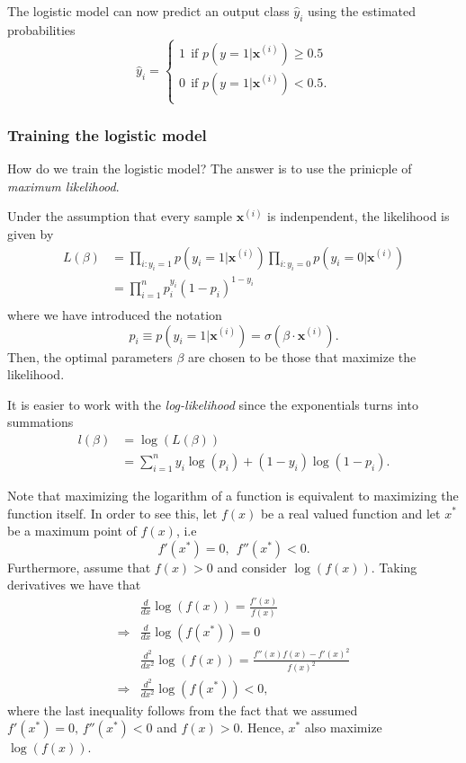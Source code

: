 \documentclass[a4paper, twocolumn]{article}
\begin{document}
The logistic model can now predict an output class $\hat{y}_i$ using the estimated probabilities  
\begin{equation}
 \hat{y}_i = \begin{cases}
            1 \ \ \text{if }  p \left(y=1 | \mathbf{x}^{(i)} \right) \geq 0.5 \\
            0 \ \ \text{if }  p \left(y=1 | \mathbf{x}^{(i)} \right) < 0.5. \\
           \end{cases}
\end{equation}
\subsubsection{Training the logistic model}
How do we train the logistic model? The answer is to use the prinicple of \textit{maximum likelihood}\autocite{Hastie}. 

Under the assumption that every sample $\mathbf{x}^{(i)}$ is indenpendent, the likelihood is given by 
\begin{align}
 L(\beta) &= \prod_{i : y_i = 1} p(y_i=1 | \mathbf{x}^{(i)}) \prod_{i : y_i = 0} p(y_i=0 | \mathbf{x}^{(i)}) \nonumber \\
 &= \prod_{i=1}^n p_i^{y_i} ( 1-p_i)^{1-y_i} \\
\end{align}
where we have introduced the notation
\begin{equation}
 p_i \equiv p(y_i=1 | \mathbf{x}^{(i)}) = \sigma(\beta \cdot \mathbf{x}^{(i)}).
\end{equation}
Then, the optimal parameters $\beta$ are chosen to be those that maximize the likelihood. 

It is easier to work with the \textit{log-likelihood} since the exponentials turns into summations
\begin{align}
 l(\beta) &= \log(L(\beta)) \nonumber \\
 &= \sum_{i=1}^n y_i \log(p_i) + (1-y_i) \log(1-p_i). 
\end{align}

Note that maximizing the logarithm of a function is equivalent to maximizing the 
function itself. In order to see this, let $f(x)$ be a
real valued function and let $x^*$ be a maximum point of $f(x)$, i.e 
\begin{equation}
 f'(x^*) = 0, \ \ f''(x^*) < 0.
\end{equation}
Furthermore, assume that $f(x) > 0$ and consider $\log(f(x))$. Taking derivatives we have that 
\begin{align}
 &\frac{d}{dx} \log (f(x)) = \frac{f'(x)}{f(x)} \\
 \Rightarrow &\frac{d}{dx} \log(f(x^*)) = 0 \\
 &\frac{d^2}{dx^2} \log(f(x)) = \frac{f''(x) f(x) - f'(x)^2}{f(x)^2} \\
 \Rightarrow &\frac{d^2}{dx^2} \log(f(x^*)) < 0, 
\end{align}
where the last inequality follows from the fact that we assumed $f'(x^*) = 0, \, f''(x^*) < 0$ and $f(x) > 0$. Hence, $x^*$
also maximize $\log(f(x))$.
\end{document}
